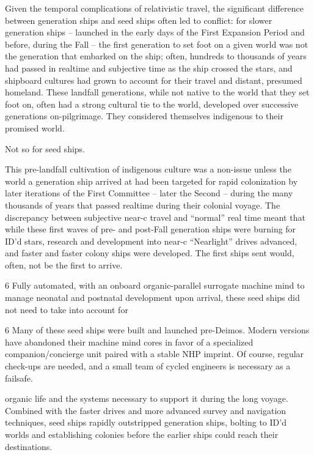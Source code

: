 Given the temporal complications of relativistic travel, the significant difference between
generation ships and seed ships often led to conflict: for slower generation ships -- launched in
the early days of the First Expansion Period and before, during the Fall -- the first generation to
set foot on a given world was not the generation that embarked on the ship; often, hundreds to
thousands of years had passed in realtime and subjective time as the ship crossed the stars, and
shipboard cultures had grown to account for their travel and distant, presumed homeland. These
landfall generations, while not native to the world that they set foot on, often had a strong
cultural tie to the world, developed over successive generations on-pilgrimage. They considered
themselves indigenous to their promised world.


Not so for seed ships.


This pre-landfall cultivation of indigenous culture was a non-issue unless the world a generation
ship arrived at had been targeted for rapid colonization by later iterations of the First Committee
-- later the Second -- during the many thousands of years that passed realtime during their
colonial voyage. The discrepancy between subjective near-c travel and “normal” real time meant
that while these first waves of pre- and post-Fall generation ships were burning for ID’d stars,
research and development into near-c “Nearlight” drives advanced, and faster and faster colony
ships were developed. The first ships sent would, often, not be the first to arrive.


                                                                                          6
Fully automated, with an onboard organic-parallel surrogate machine mind  to manage neonatal
and postnatal development upon arrival, these seed ships did not need to take into account for

6 Many of these seed ships were built and launched pre-Deimos. Modern versions have abandoned their
machine mind cores in favor of a specialized companion/concierge unit paired with a stable NHP imprint. Of
course, regular check-ups are needed, and a small team of cycled engineers is necessary as a failsafe.




organic life and the systems necessary to support it during the long voyage. Combined with the
faster drives and more advanced survey and navigation techniques, seed ships rapidly
outstripped generation ships, bolting to ID’d worlds and establishing colonies before the earlier
ships could reach their destinations.


